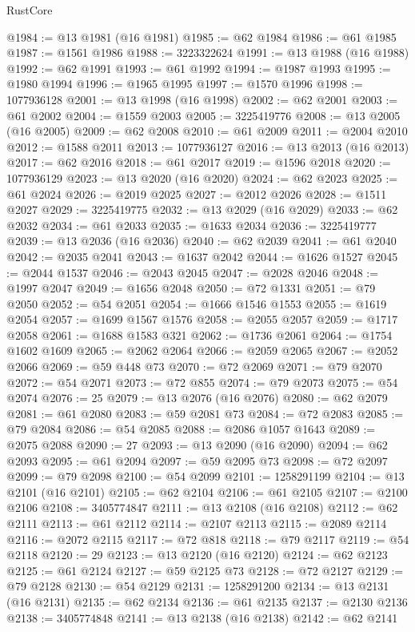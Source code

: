 \begin{lexlean}{RustCore}
\begin{coremodule}
@1984 := @13 @1981 (@16 @1981)
@1985 := @62 @1984
@1986 := @61 @1985
@1987 := @1561 @1986
@1988 := 3223322624
@1991 := @13 @1988 (@16 @1988)
@1992 := @62 @1991
@1993 := @61 @1992
@1994 := @1987 @1993
@1995 := @1980 @1994
@1996 := @1965 @1995
@1997 := @1570 @1996
@1998 := 1077936128
@2001 := @13 @1998 (@16 @1998)
@2002 := @62 @2001
@2003 := @61 @2002
@2004 := @1559 @2003
@2005 := 3225419776
@2008 := @13 @2005 (@16 @2005)
@2009 := @62 @2008
@2010 := @61 @2009
@2011 := @2004 @2010
@2012 := @1588 @2011
@2013 := 1077936127
@2016 := @13 @2013 (@16 @2013)
@2017 := @62 @2016
@2018 := @61 @2017
@2019 := @1596 @2018
@2020 := 1077936129
@2023 := @13 @2020 (@16 @2020)
@2024 := @62 @2023
@2025 := @61 @2024
@2026 := @2019 @2025
@2027 := @2012 @2026
@2028 := @1511 @2027
@2029 := 3225419775
@2032 := @13 @2029 (@16 @2029)
@2033 := @62 @2032
@2034 := @61 @2033
@2035 := @1633 @2034
@2036 := 3225419777
@2039 := @13 @2036 (@16 @2036)
@2040 := @62 @2039
@2041 := @61 @2040
@2042 := @2035 @2041
@2043 := @1637 @2042
@2044 := @1626 @1527
@2045 := @2044 @1537
@2046 := @2043 @2045
@2047 := @2028 @2046
@2048 := @1997 @2047
@2049 := @1656 @2048
@2050 := @72 @1331
@2051 := @79 @2050
@2052 := @54 @2051
@2054 := @1666 @1546 @1553
@2055 := @1619 @2054
@2057 := @1699 @1567 @1576
@2058 := @2055 @2057
@2059 := @1717 @2058
@2061 := @1688 @1583 @321
@2062 := @1736 @2061
@2064 := @1754 @1602 @1609
@2065 := @2062 @2064
@2066 := @2059 @2065
@2067 := @2052 @2066
@2069 := @59 @448 @73
@2070 := @72 @2069
@2071 := @79 @2070
@2072 := @54 @2071
@2073 := @72 @855
@2074 := @79 @2073
@2075 := @54 @2074
@2076 := 25
@2079 := @13 @2076 (@16 @2076)
@2080 := @62 @2079
@2081 := @61 @2080
@2083 := @59 @2081 @73
@2084 := @72 @2083
@2085 := @79 @2084
@2086 := @54 @2085
@2088 := @2086 @1057 @1643
@2089 := @2075 @2088
@2090 := 27
@2093 := @13 @2090 (@16 @2090)
@2094 := @62 @2093
@2095 := @61 @2094
@2097 := @59 @2095 @73
@2098 := @72 @2097
@2099 := @79 @2098
@2100 := @54 @2099
@2101 := 1258291199
@2104 := @13 @2101 (@16 @2101)
@2105 := @62 @2104
@2106 := @61 @2105
@2107 := @2100 @2106
@2108 := 3405774847
@2111 := @13 @2108 (@16 @2108)
@2112 := @62 @2111
@2113 := @61 @2112
@2114 := @2107 @2113
@2115 := @2089 @2114
@2116 := @2072 @2115
@2117 := @72 @818
@2118 := @79 @2117
@2119 := @54 @2118
@2120 := 29
@2123 := @13 @2120 (@16 @2120)
@2124 := @62 @2123
@2125 := @61 @2124
@2127 := @59 @2125 @73
@2128 := @72 @2127
@2129 := @79 @2128
@2130 := @54 @2129
@2131 := 1258291200
@2134 := @13 @2131 (@16 @2131)
@2135 := @62 @2134
@2136 := @61 @2135
@2137 := @2130 @2136
@2138 := 3405774848
@2141 := @13 @2138 (@16 @2138)
@2142 := @62 @2141

\end{coremodule}
\end{lexlean}

